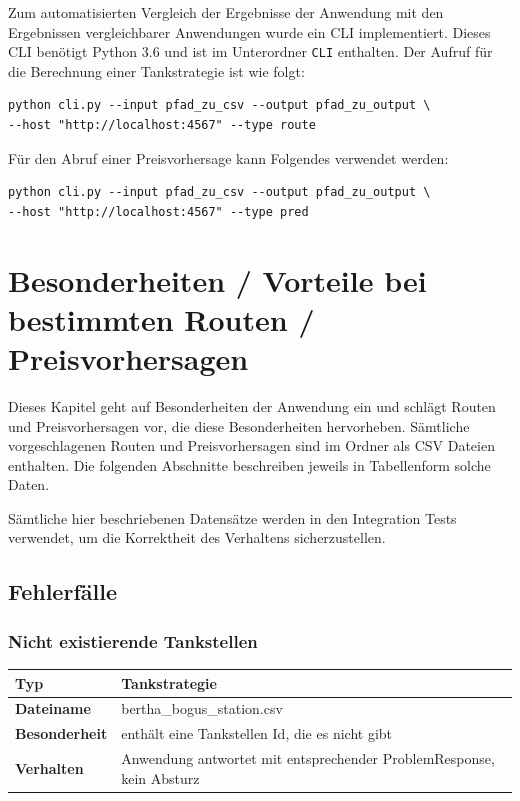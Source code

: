 \documentclass[
ngerman          %
,a4paper          %
,11pt
,pdftex
]{report}
\begin{document}
Zum automatisierten Vergleich der Ergebnisse der Anwendung mit den Ergebnissen vergleichbarer Anwendungen wurde ein \ac{CLI} implementiert. Dieses \ac{CLI} benötigt Python 3.6 und ist im Unterordner \texttt{CLI} enthalten. Der Aufruf für die Berechnung einer Tankstrategie ist wie folgt:

\begin{lstlisting}
python cli.py --input pfad_zu_csv --output pfad_zu_output \
--host "http://localhost:4567" --type route
\end{lstlisting}

Für den Abruf einer Preisvorhersage kann Folgendes verwendet werden:

\begin{lstlisting}
python cli.py --input pfad_zu_csv --output pfad_zu_output \
--host "http://localhost:4567" --type pred
\end{lstlisting}

\chapter{Besonderheiten / Vorteile bei bestimmten Routen / Preisvorhersagen}

Dieses Kapitel geht auf Besonderheiten der Anwendung ein und schlägt Routen und Preisvorhersagen vor, die diese Besonderheiten hervorheben. Sämtliche vorgeschlagenen Routen und Preisvorhersagen sind im Ordner  als \ac{CSV} Dateien enthalten. Die folgenden Abschnitte beschreiben jeweils in Tabellenform solche Daten.

Sämtliche hier beschriebenen Datensätze werden in den Integration Tests verwendet, um die Korrektheit des Verhaltens sicherzustellen.
\section{Fehlerfälle}
\subsection{Nicht existierende Tankstellen}

\begin{table}[H]
	\centering
	\begin{tabular}{l l}
		\textbf{Typ} &\textbf{Tankstrategie} \\
		\hline
		\hline 
		\textbf{Dateiname} & bertha\_bogus\_station.csv \\
        \textbf{Besonderheit} & enthält eine Tankstellen Id, die es nicht gibt \\
        \textbf{Verhalten} & Anwendung antwortet mit entsprechender ProblemResponse, kein Absturz \\
		\hline 
	\end{tabular}
\end{table} 
\end{document}
